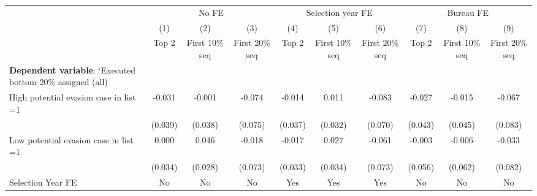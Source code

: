 {
\def\sym#1{\ifmmode^{#1}\else\(^{#1}\)\fi}
\begin{tabular}{l*{9}{c}}
\toprule
            &\multicolumn{3}{c}{No FE}                                        &\multicolumn{3}{c}{Selection year FE}                            &\multicolumn{3}{c}{Bureau FE}                                    \\\cmidrule(lr){2-4}\cmidrule(lr){5-7}\cmidrule(lr){8-10}
            &\multicolumn{1}{c}{(1)}&\multicolumn{1}{c}{(2)}&\multicolumn{1}{c}{(3)}&\multicolumn{1}{c}{(4)}&\multicolumn{1}{c}{(5)}&\multicolumn{1}{c}{(6)}&\multicolumn{1}{c}{(7)}&\multicolumn{1}{c}{(8)}&\multicolumn{1}{c}{(9)}\\
            &\multicolumn{1}{c}{Top 2}&\multicolumn{1}{c}{First 10\% seq}&\multicolumn{1}{c}{First 20\% seq}&\multicolumn{1}{c}{Top 2}&\multicolumn{1}{c}{First 10\% seq}&\multicolumn{1}{c}{First 20\% seq}&\multicolumn{1}{c}{Top 2}&\multicolumn{1}{c}{First 10\% seq}&\multicolumn{1}{c}{First 20\% seq}\\
\midrule
\textbf{Dependent variable}: `Executed bottom-20\% \/ assigned (all)&                     &                     &                     &                     &                     &                     &                     &                     &                     \\
\addlinespace
High potential evasion case in list =1&      -0.031         &      -0.001         &      -0.074         &      -0.014         &       0.011         &      -0.083         &      -0.027         &      -0.015         &      -0.067         \\
            &     (0.039)         &     (0.038)         &     (0.075)         &     (0.037)         &     (0.032)         &     (0.070)         &     (0.043)         &     (0.045)         &     (0.083)         \\
\addlinespace
Low potential evasion case in list =1&       0.000         &       0.046         &      -0.018         &      -0.017         &       0.027         &      -0.061         &      -0.003         &      -0.006         &      -0.033         \\
            &     (0.034)         &     (0.028)         &     (0.073)         &     (0.033)         &     (0.034)         &     (0.073)         &     (0.056)         &     (0.062)         &     (0.082)         \\
\midrule
Selection Year FE&          No         &          No         &          No         &         Yes         &         Yes         &         Yes         &          No         &          No         &          No         \\

\end{tabular}}
